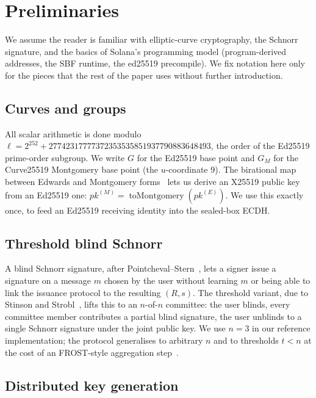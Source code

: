 \section{Preliminaries}
\label{sec:prelim}

We assume the reader is familiar with elliptic-curve cryptography, the Schnorr signature, and the basics of Solana's programming model (program-derived addresses, the SBF runtime, the ed25519 precompile). We fix notation here only for the pieces that the rest of the paper uses without further introduction.

\subsection{Curves and groups}

All scalar arithmetic is done modulo $\ell = 2^{252} + 27742317777372353535851937790883648493$, the order of the Ed25519 prime-order subgroup. We write $G$ for the Ed25519 base point and $G_M$ for the Curve25519 Montgomery base point (the $u$-coordinate $9$). The birational map between Edwards and Montgomery forms~\cite{rfc7748} lets us derive an X25519 public key from an Ed25519 one: $pk^{(M)} = \operatorname{toMontgomery}(pk^{(E)})$. We use this exactly once, to feed an Ed25519 receiving identity into the sealed-box ECDH.

\subsection{Threshold blind Schnorr}

A blind Schnorr signature, after Pointcheval--Stern~\cite{pointchevalstern1996}, lets a signer issue a signature on a message $m$ chosen by the user without learning $m$ or being able to link the issuance protocol to the resulting $(R, s)$. The threshold variant, due to Stinson and Strobl~\cite{stinsonstrobl2001}, lifts this to an $n$-of-$n$ committee: the user blinds, every committee member contributes a partial blind signature, the user unblinds to a single Schnorr signature under the joint public key. We use $n = 3$ in our reference implementation; the protocol generalises to arbitrary $n$ and to thresholds $t < n$ at the cost of an FROST-style aggregation step~\cite{komlogoldberg2020}.

\subsection{Distributed key generation}

